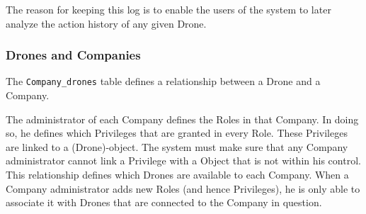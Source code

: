 The reason for keeping this log is to enable the users of the system to later analyze the action history of any given Drone.


\subsubsection{Drones and Companies}
The \verb+Company_drones+ table defines a relationship between a Drone and a Company.

The administrator of each Company defines the Roles in that Company.
In doing so, he defines which Privileges that are granted in every Role.
These Privileges are linked to a (Drone)-object.
The system must make sure that any Company administrator cannot link a Privilege with a Object that is not within his control. \\

This relationship defines which Drones are available to each Company.
When a Company administrator adds new Roles (and hence Privileges), he is only able to associate it with Drones that are connected to the Company in question.










